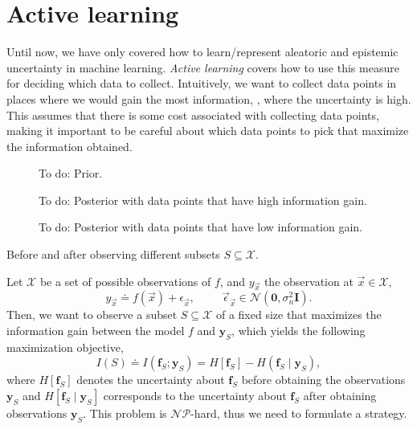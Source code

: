 \section{Active learning} \label{sec:active_learning}

Until now, we have only covered how to learn/represent aleatoric and epistemic
uncertainty in machine learning. \textit{Active learning} covers how to use
this measure for deciding which data to collect. Intuitively, we want to
collect data points in places where we would gain the most information, \ie,
where the uncertainty is high. This assumes that there is some cost associated
with collecting data points, making it important to be careful about which data
points to pick that maximize the information obtained.

\begin{marginfigure}
  \centering
  \begin{subfigure}[b]{\textwidth}
    \caption{To do: Prior.}
    \label{fig:prior-infogain}
  \end{subfigure}
  \vfill
  \begin{subfigure}[b]{\textwidth}
    \caption{To do: Posterior with data points that have high information
    gain.}
    \label{fig:high-infogain}
  \end{subfigure}
  \vfill
  \begin{subfigure}[b]{\textwidth}
    \caption{To do: Posterior with data points that have low information
    gain.}
    \label{fig:low-infogain}
  \end{subfigure}
  \caption{Before and after observing different subsets
  $S\subseteq\mathcal{X}$.}
  \label{fig:infogain}
\end{marginfigure}

Let $\mathcal{X}$ be a set of possible observations of $f$, and $y_{\vec{x}}$
the observation at $\vec{x}\in\mathcal{X}$, \[
  y_{\vec{x}} \doteq f(\vec{x}) + \epsilon_{\vec{x}}, \hspace{1cm} \vec{\epsilon}_{\vec{x}} \in \mathcal{N}(\bm{0},\sigma_n^2 \bm{I})
.\]
Then, we want to observe a subset $S\subseteq\mathcal{X}$ of a fixed size
that maximizes the information gain between the model $f$ and $\bm{y}_S$,
which yields the following maximization objective, \[
  I(S) \doteq I(\bm{f}_S;\bm{y}_S) = H[\bm{f}_S] - H(\bm{f}_S\mid\bm{y}_S)
,\]
where $H[\bm{f}_S]$ denotes the uncertainty about $\bm{f}_S$ before obtaining
the observations $\bm{y}_S$ and $H[\bm{f}_S\mid\bm{y}_S]$ corresponds to the
uncertainty about $\bm{f}_S$ after obtaining observations $\bm{y}_S$. This
problem is $\mathcal{NP}$-hard, thus we need to formulate a strategy.

